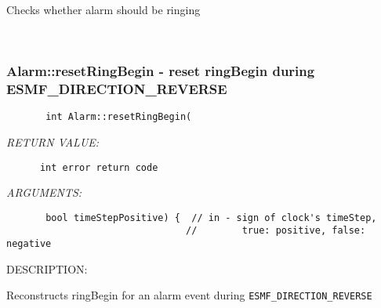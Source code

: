       Checks whether alarm should be ringing
   
 
\mbox{}\hrulefill\
 
\subsubsection [Alarm::resetRingBegin] {Alarm::resetRingBegin - reset ringBegin during ESMF\_DIRECTION\_REVERSE}


  
\begin{verbatim}       int Alarm::resetRingBegin(\end{verbatim}{\em RETURN VALUE:}
\begin{verbatim}      int error return code\end{verbatim}{\em ARGUMENTS:}
\begin{verbatim}       bool timeStepPositive) {  // in - sign of clock's timeStep,
                                //        true: positive, false: negative\end{verbatim}
{\sf DESCRIPTION:\\ }


        Reconstructs ringBegin for an alarm event during
        {\tt ESMF\_DIRECTION\_REVERSE}
  
\setlength{\parskip}{\oldparskip}
\setlength{\parindent}{\oldparindent}
\setlength{\baselineskip}{\oldbaselineskip}
